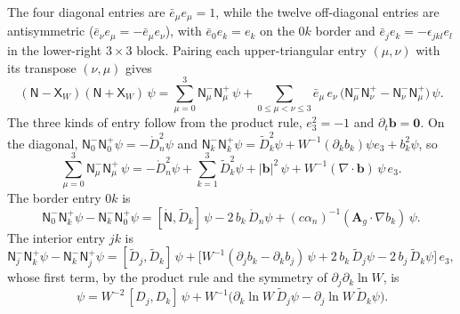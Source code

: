\documentclass[aps,prd,onecolumn,tightenlines,nofootinbib,notitlepage,11pt,floatfix]{revtex4-2}
\theoremstyle{indentedtheorem}
\begin{document}
The four diagonal entries are $\bar{e}_\mu e_\mu = 1$, while the twelve off-diagonal entries are antisymmetric ($\bar{e}_\nu e_\mu = -\bar{e}_\mu e_\nu$), with $\bar{e}_0 e_k = e_k$ on the $0k$ border and $\bar{e}_j e_k = -\epsilon_{jkl}e_l$ in the lower-right $3\times 3$ block. Pairing each upper-triangular entry $(\mu,\nu)$ with its transpose $(\nu,\mu)$ gives
\begin{equation}
    (\mathsf{N}-\mathsf{X}_W)(\mathsf{N}+\mathsf{X}_W)\,\psi = \sum_{\mu=0}^{3} \mathsf{N}_\mu^-\mathsf{N}_\mu^+\,\psi + \sum_{0\le\mu<\nu\le3} \bar{e}_\mu\,e_\nu\,\big(\mathsf{N}_\mu^-\mathsf{N}_\nu^+ - \mathsf{N}_\nu^-\mathsf{N}_\mu^+\big)\,\psi .
    \label{eq:general_table}
\end{equation}
The three kinds of entry follow from the product rule, $e_3^2=-1$ and $\partial_t\mathbf{b}=\mathbf{0}$. On the diagonal, $\mathsf{N}_0^-\mathsf{N}_0^+\psi = -\mathring{D}_n^2\psi$ and $\mathsf{N}_k^-\mathsf{N}_k^+\psi = \tilde{D}_k^2\psi + W^{-1}(\partial_kb_k)\psi e_3 + b_k^2\psi$, so
\begin{equation*}
    \sum_{\mu=0}^{3} \mathsf{N}_\mu^-\mathsf{N}_\mu^+\,\psi = -\mathring{D}_n^2\psi + \sum_{k=1}^3 \tilde{D}_k^2\psi + |\mathbf{b}|^2\,\psi + W^{-1}(\nabla\cdot\mathbf{b})\,\psi\,e_3 .
\end{equation*}
The border entry $0k$ is
\begin{equation*}
    \mathsf{N}_0^-\mathsf{N}_k^+\psi - \mathsf{N}_k^-\mathsf{N}_0^+\psi = [\mathring{\mathsf{N}},\tilde{D}_k]\,\psi - 2\,b_k\,\mathring{D}_n\psi + (c\alpha_n)^{-1}(\mathbf{A}_g\cdot\nabla b_k)\,\psi .
\end{equation*}
The interior entry $jk$ is
\begin{equation*}
    \mathsf{N}_j^-\mathsf{N}_k^+\psi - \mathsf{N}_k^-\mathsf{N}_j^+\psi = [\tilde{D}_j,\tilde{D}_k]\,\psi + \big[W^{-1}(\partial_jb_k-\partial_kb_j)\,\psi + 2\,b_k\,\tilde{D}_j\psi - 2\,b_j\,\tilde{D}_k\psi\big]\,e_3 ,
\end{equation*}
whose first term, by the product rule and the symmetry of $\partial_j\partial_k\ln W$, is
\begin{equation*}
    [\tilde{D}_j,\tilde{D}_k]\,\psi = W^{-2}\,[D_j,D_k]\,\psi + W^{-1}\big(\partial_k\ln W\,\tilde{D}_j\psi - \partial_j\ln W\,\tilde{D}_k\psi\big) .
\end{equation*}
\end{document}
